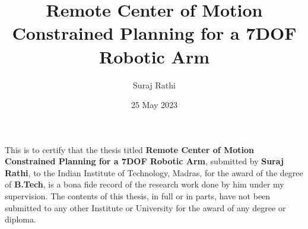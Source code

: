 \documentclass[BTech]{iitmdiss}
\begin{document}
    \newcommand{\titleText}{Remote Center of Motion Constrained Planning for a 7DOF Robotic Arm}
    \newcommand{\authorText}{Suraj Rathi}
    \title{\titleText}

    \author{\authorText}

    \date{25 May 2023}

    \maketitle

    \certificate

    \vspace*{0.5in}

    \noindent This is to certify that the thesis titled {\bf \titleText}, submitted by {\bf \authorText},
    to the Indian Institute of Technology, Madras, for
    the award of the degree of {\bf B.Tech}, is a bona fide
    record of the research work done by him under my supervision. The
    contents of this thesis, in full or in parts, have not been submitted
    to any other Institute or University for the award of any degree or
    diploma.

    \vspace*{1.5in}
\end{document}
